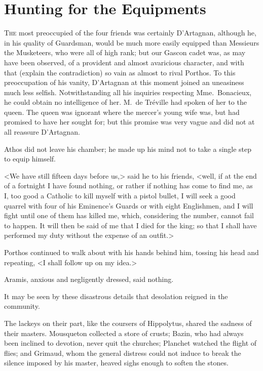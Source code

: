 
\chapter{Hunting for the Equipments}

\lettrine{T}{he} most preoccupied of the four friends was certainly D'Artagnan, although he, in his quality of Guardsman, would be much more easily equipped than Messieurs the Musketeers, who were all of high rank; but our Gascon cadet was, as may have been observed, of a provident and almost avaricious character, and with that (explain the contradiction) so vain as almost to rival Porthos. To this preoccupation of his vanity, D'Artagnan at this moment joined an uneasiness much less selfish. Notwithstanding all his inquiries respecting Mme.~Bonacieux, he could obtain no intelligence of her. M.~de Tréville had spoken of her to the queen. The queen was ignorant where the mercer's young wife was, but had promised to have her sought for; but this promise was very vague and did not at all reassure D'Artagnan. 

Athos did not leave his chamber; he made up his mind not to take a single step to equip himself. 

<We have still fifteen days before us,> said he to his friends, <well, if at the end of a fortnight I have found nothing, or rather if nothing has come to find me, as I, too good a Catholic to kill myself with a pistol bullet, I will seek a good quarrel with four of his Eminence's Guards or with eight Englishmen, and I will fight until one of them has killed me, which, considering the number, cannot fail to happen. It will then be said of me that I died for the king; so that I shall have performed my duty without the expense of an outfit.> 

Porthos continued to walk about with his hands behind him, tossing his head and repeating, <I shall follow up on my idea.> 

Aramis, anxious and negligently dressed, said nothing. 

It may be seen by these disastrous details that desolation reigned in the community. 

The lackeys on their part, like the coursers of Hippolytus, shared the sadness of their masters. Mousqueton collected a store of crusts; Bazin, who had always been inclined to devotion, never quit the churches; Planchet watched the flight of flies; and Grimaud, whom the general distress could not induce to break the silence imposed by his master, heaved sighs enough to soften the stones. 

